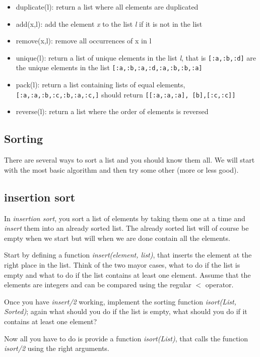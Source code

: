 \documentclass[a4paper,11pt]{article}
\begin{document}
\begin{itemize}
\item duplicate(l): return a list where all elements are duplicated
\item add(x,l): add the element {\em x} to the list {\em l} if it is not in the list
\item remove(x,l): remove all occurrences of x in l 
\item unique(l): return a list of unique elements in the list {\em l},
  that is {\tt [:a,:b,:d]} are the unique elements in the list {\tt [:a,:b,:a,:d,:a,:b,:b,:a]}
\item pack(l): return a list containing lists of equal elements, {\tt
  [:a,:a,:b,:c,:b,:a,:c,]} should return {\tt [[:a,:a,:a], [b],[:c,:c]]}
\item reverse(l): return a list where the order of elements is reversed
\end{itemize}



\subsection{Sorting}

There are several ways to sort a list and you should know them all. We
will start with the most basic algorithm and then try some other (more or less good).

\subsection{insertion sort}

In {\em insertion sort}, you sort a list of elements by taking them
one at a time and {\em insert} them into an already sorted list. The
already sorted list will of course be empty when we start but will
when we are done contain all the elements.

Start by defining a function {\em insert(element, list)}, that inserts
the element at the right place in the list. Think of the two mayor
cases, what to do if the list is empty and what to do if the list
contains at least one element. Assume that the elements are integers
and can be compared using the regular $<$ operator.

Once you have {\em insert/2} working, implement the sorting function
{\em isort(List, Sorted)}; again what should you do if the list is
empty, what should you do if it contains at least one element?

Now all you have to do is provide a function {\em isort(List)}, that
calls the function {\em isort/2} using the right arguments.
\end{document}
